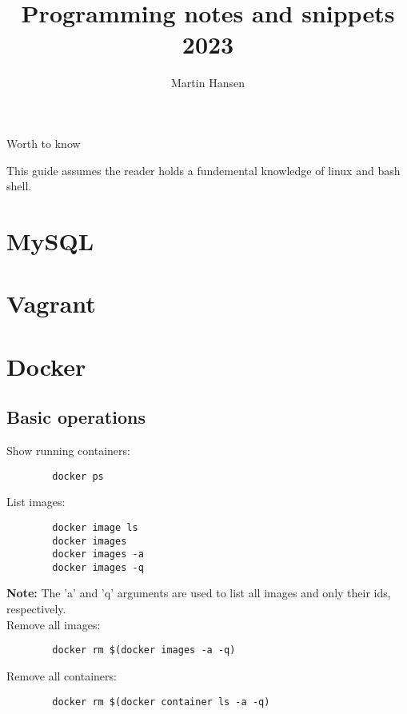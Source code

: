\documentclass{article}
\author{Martin Hansen}
\title{Programming notes and snippets 2023}
\newcommand{\centeredHeadline}[1]{\begin{center}\large #1\end{center}}
\newcommand{\note}{\textbf{Note:} }
\begin{document}
	
	\frenchspacing
	\maketitle
	
	\pagebreak
	
	\centeredHeadline{Worth to know}
	
	This guide assumes the reader holds a fundemental knowledge of linux and bash shell.  
	
	\pagebreak
	
	\tableofcontents
	
	\pagebreak
	
	\section{MySQL}
	
	\section{Vagrant}
	
	\section{Docker}
	
	\subsection{Basic  operations}
	Show running containers:
	
	\begin{lstlisting}
		docker ps
	\end{lstlisting}
	
	List images:
	
	\begin{lstlisting}
		docker image ls
		docker images
		docker images -a
		docker images -q
	\end{lstlisting}

	\note{} The 'a' and 'q' arguments are used to list all images and only their ids, respectively.\\
	
	Remove all images:
	
	\begin{lstlisting}
		docker rm $(docker images -a -q)
	\end{lstlisting}

	Remove all containers:
	
	\begin{lstlisting}
		docker rm $(docker container ls -a -q)
	\end{lstlisting}
\end{document}

